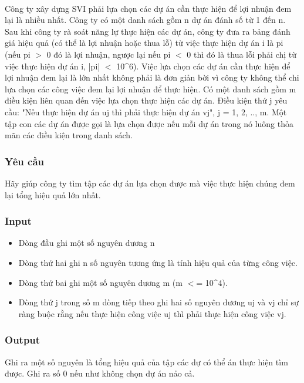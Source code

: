 

 

Công ty xây dựng SVI phải lựa chọn các dự án cần thực hiện để lợi nhuận đem lại là nhiều nhất. Công ty có một danh sách gồm n dự án đánh số từ 1 đến n. Sau khi công ty rà soát năng lự thực hiện các dự án, công ty đưa ra bảng đánh giá hiệu quả (có thể là lợi nhuận hoặc thua lỗ) từ việc thực hiện dự án i là pi (nếu pi $>$ 0 đó là lợi nhuận, ngược lại nếu pi $<$ 0 thì đó là thua lỗi phải chị từ việc thực hiện dự án i, |pi| $<$ 10\textasciicircum6). Việc lựa chọn các dự án cần thực hiện để lợi nhuận đem lại là lớn nhất không phải là đơn giản bời vì công ty không thể chi lựa chọn các công việc đem lại lợi nhuận để thực hiện. Có một danh sách gồm m điều kiện liên quan đến việc lựa chọn thực hiện các dự án. Điều kiện thứ j yêu cầu: "Nếu thực hiện dự án uj thì phải thực hiện dự án vj", j = 1, 2, .., m. Một tập con các dự án được gọi là lựa chọn được nếu mỗi dự án trong nó luông thỏa mãn các điều kiện trong danh sách.

\subsubsection{Yêu cầu}

Hãy giúp công ty tìm tập các dự án lựa chọn được mà việc thực hiện chúng đem lại tổng hiệu quả lớn nhất.

\subsubsection{Input}
\begin{itemize}
	\item Dòng đầu ghi một số nguyên dương n
	\item Dòng thứ hai ghi n số nguyên tương ứng là tính hiệu quả của từng công việc.
	\item Dòng thứ bai ghi một số nguyên dương m (m $<$= 10\textasciicircum4).
	\item Dòng thứ j trong số m dòng tiếp theo ghi hai số nguyên dương uj và vj chỉ sự ràng buộc rằng nếu thực hiện công việc uj thì phải thực hiện công việc vj.
\end{itemize}

\subsubsection{Output}

Ghi ra một số nguyên là tổng hiệu quả của tập các dự có thể án thực hiện tìm được. Ghi ra số 0 nếu như không chọn dự án nảo cả.

